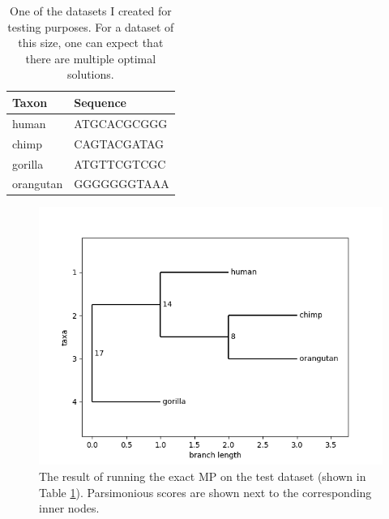 \documentclass[11pt,twocolumn]{article}
\begin{document}
\begin{minipage}[b]{.475\textwidth}
\begin{table}[H]
	\centering
	\begin{tabular}{ll}
		\toprule
		Taxon & Sequence \\
		\midrule
		human & ATGCACGCGGG \\
		chimp & CAGTACGATAG \\
		gorilla & ATGTTCGTCGC \\
		orangutan & GGGGGGGTAAA \\
		\bottomrule
	\end{tabular}
\caption{One of the datasets I created for testing purposes. For a dataset of this size, one can expect that there are multiple optimal solutions.}
\label{table:test_data}
\end{table}

\end{minipage}%
\hfill
\begin{minipage}[b]{0.475\textwidth}
	
\begin{figure}[H]
\includegraphics[width=0.98\linewidth]{img/test.png}
\caption{The result of running the exact MP on the test dataset (shown in Table \ref{table:test_data}). Parsimonious scores are shown next to the corresponding inner nodes.}
\label{fig:test}
\end{figure}
\end{minipage}
\end{document}
